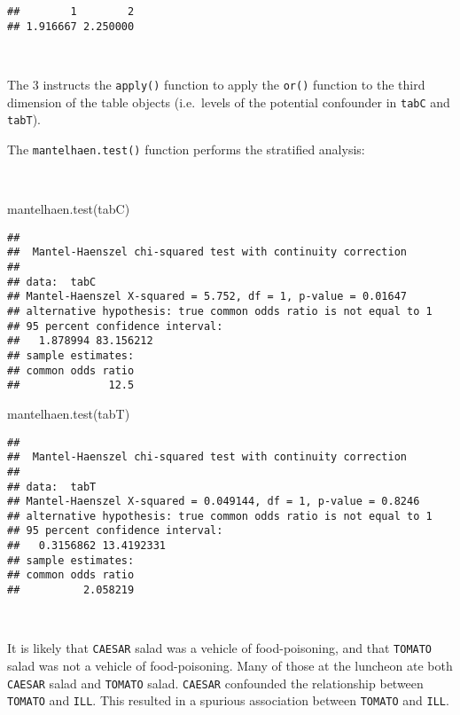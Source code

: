 \documentclass[
  12pt,
  a4paper]{book}
\newenvironment{Shaded}{\begin{snugshade}}{\end{snugshade}}
\newcommand{\FunctionTok}[1]{\textcolor[rgb]{0.00,0.00,0.00}{#1}}
\newcommand{\NormalTok}[1]{#1}
\begin{document}
\begin{verbatim}
##        1        2 
## 1.916667 2.250000
\end{verbatim}

~

The 3 instructs the \texttt{apply()} function to apply the \texttt{or()} function to the third dimension of the table objects (i.e.~levels of the potential confounder in \texttt{tabC} and \texttt{tabT}).

The \texttt{mantelhaen.test()} function performs the stratified analysis:

~

\begin{Shaded}
\begin{Highlighting}[]
\FunctionTok{mantelhaen.test}\NormalTok{(tabC)}
\end{Highlighting}
\end{Shaded}

\begin{verbatim}
## 
##  Mantel-Haenszel chi-squared test with continuity correction
## 
## data:  tabC
## Mantel-Haenszel X-squared = 5.752, df = 1, p-value = 0.01647
## alternative hypothesis: true common odds ratio is not equal to 1
## 95 percent confidence interval:
##   1.878994 83.156212
## sample estimates:
## common odds ratio 
##              12.5
\end{verbatim}

\begin{Shaded}
\begin{Highlighting}[]
\FunctionTok{mantelhaen.test}\NormalTok{(tabT)}
\end{Highlighting}
\end{Shaded}

\begin{verbatim}
## 
##  Mantel-Haenszel chi-squared test with continuity correction
## 
## data:  tabT
## Mantel-Haenszel X-squared = 0.049144, df = 1, p-value = 0.8246
## alternative hypothesis: true common odds ratio is not equal to 1
## 95 percent confidence interval:
##   0.3156862 13.4192331
## sample estimates:
## common odds ratio 
##          2.058219
\end{verbatim}

~

It is likely that \texttt{CAESAR} salad was a vehicle of food-poisoning, and that \texttt{TOMATO} salad was not a vehicle of food-poisoning. Many of those at the luncheon ate both \texttt{CAESAR} salad and \texttt{TOMATO} salad. \texttt{CAESAR} confounded the relationship between \texttt{TOMATO} and \texttt{ILL}. This resulted in a spurious association between \texttt{TOMATO} and \texttt{ILL}.
\end{document}
